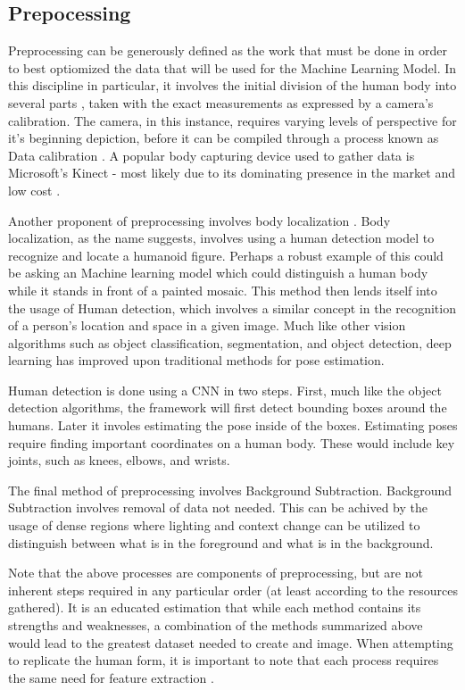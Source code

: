 \documentclass[12pt]{extarticle}
\begin{document}
\subsection{Prepocessing}
Preprocessing can be generously defined as the work that must be done in order
to best optiomized the data that will be used for the Machine Learning Model. In
this discipline in particular, it involves the initial division of the human
body into several parts \cite{papandreou2018personlab}, taken with the exact
measurements as expressed by a camera's calibration. The camera, in this
instance, requires varying levels of perspective for it's beginning depiction,
before it can be compiled through a process known as Data calibration
\cite{StollC2011Famt}. A popular body capturing device used to gather data is
Microsoft's Kinect - most likely due to its dominating presence in the market
and low cost \cite{Diego-MasJoseAntonio2014UKsi}.

Another proponent of preprocessing involves body localization
\cite{LiuZhao2015Asoh}. Body localization, as the name suggests, involves using
a human detection model to recognize and locate a humanoid figure. Perhaps a
robust example of this could be asking an Machine learning model which could
distinguish a human body while it stands in front of a painted mosaic. This
method then lends itself into the usage of Human detection, which involves a
similar concept in the recognition of a person's location and space in a given
image. Much like other vision algorithms such as object classification,
segmentation, and object detection, deep learning has improved upon traditional
methods for pose estimation.

Human detection is done using a CNN in two steps. First, much like the object
detection algorithms, the framework will first detect bounding boxes around the
humans. Later it involes estimating the pose inside of the boxes. Estimating
poses require finding important coordinates on a human body. These would include
key joints, such as knees, elbows, and wrists.

The final method of preprocessing involves Background Subtraction. Background
Subtraction involves removal of data not needed. This can be achived by the
usage of dense regions \cite{BMVC.24.34} where lighting and context change can
be utilized to distinguish between what is in the foreground and what is in the
background.

Note that the above processes are components of preprocessing, but are not
inherent steps required in any particular order (at least according to the
resources gathered). It is an educated estimation that while each method
contains its strengths and weaknesses, a combination of the methods summarized
above would lead to the greatest dataset needed to create and image. When
attempting to replicate the human form, it is important to note that each
process requires the same need for feature extraction \cite{LiuZhao2015Asoh}.
\end{document}
